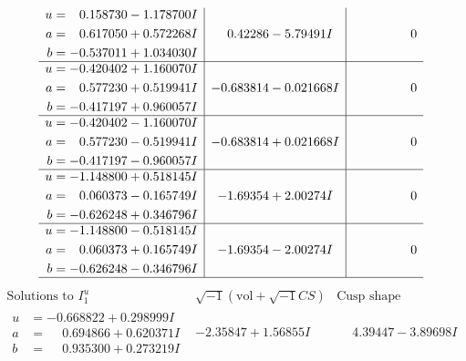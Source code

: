 \documentclass[1p]{elsarticle_modified}
\theoremstyle{definition}
\newcommand{\I}{\sqrt{-1}}
\begin{document}
$$\begin{array}{c|c|c}
\begin{aligned}
u &= \phantom{-}0.158730 - 1.178700 I \\
a &= \phantom{-}0.617050 + 0.572268 I \\
b &= -0.537011 + 1.034030 I\end{aligned}
 & \phantom{-}0.42286 - 5.79491 I & \phantom{-0.000000 } 0 \\ \hline\begin{aligned}
u &= -0.420402 + 1.160070 I \\
a &= \phantom{-}0.577230 + 0.519941 I \\
b &= -0.417197 + 0.960057 I\end{aligned}
 & -0.683814 - 0.021668 I & \phantom{-0.000000 } 0 \\ \hline\begin{aligned}
u &= -0.420402 - 1.160070 I \\
a &= \phantom{-}0.577230 - 0.519941 I \\
b &= -0.417197 - 0.960057 I\end{aligned}
 & -0.683814 + 0.021668 I & \phantom{-0.000000 } 0 \\ \hline\begin{aligned}
u &= -1.148800 + 0.518145 I \\
a &= \phantom{-}0.060373 - 0.165749 I \\
b &= -0.626248 + 0.346796 I\end{aligned}
 & -1.69354 + 2.00274 I & \phantom{-0.000000 } 0 \\ \hline\begin{aligned}
u &= -1.148800 - 0.518145 I \\
a &= \phantom{-}0.060373 + 0.165749 I \\
b &= -0.626248 - 0.346796 I\end{aligned}
 & -1.69354 - 2.00274 I & \phantom{-0.000000 } 0\\
 \hline 
 \end{array}$$\newpage$$\begin{array}{c|c|c}  
\text{Solutions to }I^u_{1}& \I (\text{vol} + \sqrt{-1}CS) & \text{Cusp shape}\\
 \hline 
\begin{aligned}
u &= -0.668822 + 0.298999 I \\
a &= \phantom{-}0.694866 + 0.620371 I \\
b &= \phantom{-}0.935300 + 0.273219 I\end{aligned}
 & -2.35847 + 1.56855 I & \phantom{-}4.39447 - 3.89698 I \\ \hline\begin{aligned}

\end{aligned}
\end{array}$$
\end{document}
